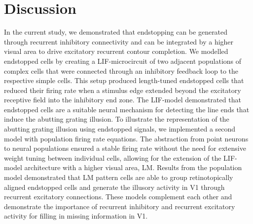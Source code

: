 \documentclass[12pt]{article}
\begin{document}
\section*{Discussion}
\setlength{\parindent}{24pt} 
In the current study, we demonstrated that endstopping can be generated through recurrent inhibitory connectivity and can be integrated by a higher visual area to drive excitatory recurrent contour completion. We modelled endstopped cells by creating a LIF-microcircuit of two adjacent populations of complex cells that were connected through an inhibitory feedback loop to the respective simple cells. This setup produced length-tuned endstopped cells that reduced their firing rate when a stimulus edge extended beyond the excitatory receptive field into the inhibitory end zone. The LIF-model demonstrated that endstopped cells are a suitable neural mechanism for detecting the line ends that induce the abutting grating illusion. To illustrate the representation of the abutting grating illusion using endstopped signals, we implemented a second model with population firing rate equations. The abstraction from point neurons to neural populations ensured a stable firing rate without the need for extensive weight tuning between individual cells, allowing for the extension of the LIF-model architecture with a higher visual area, LM. Results from the population model demonstrated that LM pattern cells are able to group retinotopically aligned endstopped cells and generate the illusory activity in V1 through recurrent excitatory connections. These models complement each other and demonstrate the importance of recurrent inhibitory and recurrent excitatory activity for filling in missing information in V1. 
\setlength{\parindent}{0pt}
\bigbreak
\end{document}
